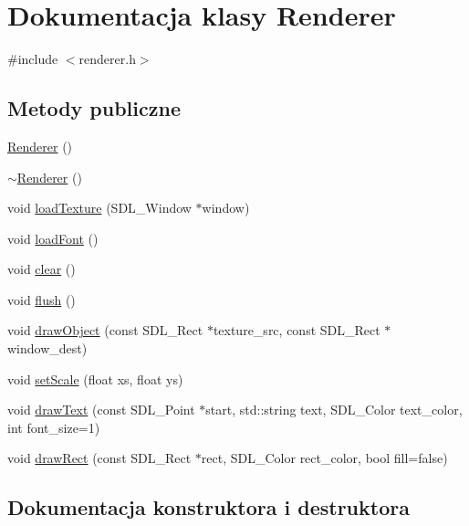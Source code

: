 \hypertarget{class_renderer}{}\section{Dokumentacja klasy Renderer}
\label{class_renderer}


{\ttfamily \#include $<$renderer.\+h$>$}

\subsection*{Metody publiczne}
\begin{DoxyCompactItemize}
\item 
\hyperlink{class_renderer_a7ebf46f54dab9905f79b80f7fddb76a6}{Renderer} ()
\item 
\hyperlink{class_renderer_afeee408862d5bd6255a6882d47e6d5cd}{$\sim$\+Renderer} ()
\item 
void \hyperlink{class_renderer_a08b774e4621e4c4ab96783dcdc8c17d7}{load\+Texture} (S\+D\+L\+\_\+\+Window $\ast$window)
\item 
void \hyperlink{class_renderer_a3f2e2461fbefbe1760f28e2894079095}{load\+Font} ()
\item 
void \hyperlink{class_renderer_ac46720b3fc0dbb2fc37674766490a8c4}{clear} ()
\item 
void \hyperlink{class_renderer_a35401aa28259d4560aba5cebd2bac4e3}{flush} ()
\item 
void \hyperlink{class_renderer_a1b5467dd2cfb2cb146c29c200b9bb251}{draw\+Object} (const S\+D\+L\+\_\+\+Rect $\ast$texture\+\_\+src, const S\+D\+L\+\_\+\+Rect $\ast$window\+\_\+dest)
\item 
void \hyperlink{class_renderer_a32ff9710cfe1208b4d9c5d9b6b3cc34d}{set\+Scale} (float xs, float ys)
\item 
void \hyperlink{class_renderer_ac92b4e807b90c910e1bac003754a5ea6}{draw\+Text} (const S\+D\+L\+\_\+\+Point $\ast$start, std\+::string text, S\+D\+L\+\_\+\+Color text\+\_\+color, int font\+\_\+size=1)
\item 
void \hyperlink{class_renderer_a60b7766e3951432d333f90e55fcebd6a}{draw\+Rect} (const S\+D\+L\+\_\+\+Rect $\ast$rect, S\+D\+L\+\_\+\+Color rect\+\_\+color, bool fill=false)
\end{DoxyCompactItemize}


\subsection{Dokumentacja konstruktora i destruktora}
\hypertarget{class_renderer_a7ebf46f54dab9905f79b80f7fddb76a6}{}
